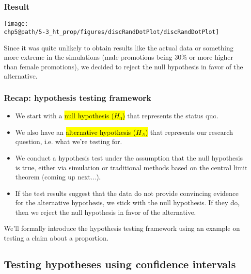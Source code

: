 \documentclass[t,compress,mathserif]{beamer}
\makeatletter
\def\chp5@path{../../Chp 5}
\makeatother
\begin{document}

\begin{frame}
\frametitle{Result}

\begin{center}
\texttt{[image: \\chp5@path/5-3\_ht\_prop/figures/discRandDotPlot/discRandDotPlot]}
\end{center}

\pause

Since it was quite unlikely to obtain results like the actual data or something more extreme in the simulations (male promotions being 30\% or more higher than female promotions), we decided to reject the null hypothesis in favor of the alternative.

\end{frame}


\begin{frame}
\frametitle{Recap: hypothesis testing framework}

\begin{itemize}
\item We start with a \hl{null hypothesis ($H_0$)} that represents the status quo.
\pause
\item We also have an \hl{alternative hypothesis ($H_A$)} that represents our research question, i.e. what we're testing for.
\pause
\item We conduct a hypothesis test under the assumption that the null hypothesis is true, either via simulation or traditional methods based on the central limit theorem (coming up next...).
\pause
\item If the test results suggest that the data do not provide convincing evidence for the alternative hypothesis, we stick with the null hypothesis. If they do, then we reject the null hypothesis in favor of the alternative.
\end{itemize}
\pause
We'll formally introduce the hypothesis testing framework using an example on testing a claim about a proportion.

\end{frame}


 \subsection{Testing hypotheses using confidence intervals} 
\end{document}
